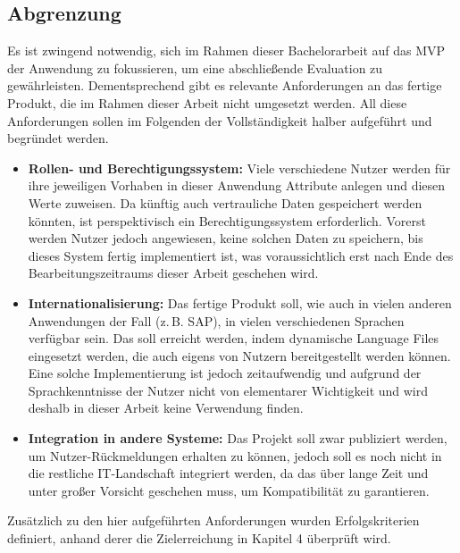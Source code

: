 \subsection{Abgrenzung}
Es ist zwingend notwendig, sich im Rahmen dieser Bachelorarbeit auf das MVP der Anwendung zu fokussieren, um eine abschließende
Evaluation zu gewährleisten. Dementsprechend gibt es relevante Anforderungen an das fertige Produkt, die im Rahmen dieser Arbeit 
nicht umgesetzt werden. All diese Anforderungen sollen im Folgenden der Vollständigkeit halber aufgeführt und begründet werden.

\begin{itemize}
  \item \textbf{Rollen- und Berechtigungssystem:} 
  Viele verschiedene Nutzer werden für ihre jeweiligen Vorhaben in dieser Anwendung Attribute anlegen und diesen Werte zuweisen. Da künftig auch vertrauliche Daten gespeichert 
  werden könnten, ist perspektivisch ein Berechtigungssystem erforderlich. Vorerst werden Nutzer jedoch angewiesen, keine solchen Daten zu speichern, bis dieses System fertig 
  implementiert ist, was voraussichtlich erst nach Ende des Bearbeitungszeitraums dieser Arbeit geschehen wird.
  
  \item \textbf{Internationalisierung:} 
  Das fertige Produkt soll, wie auch in vielen anderen Anwendungen der Fall (z.\,B. SAP), in vielen verschiedenen Sprachen verfügbar sein. 
  Das soll erreicht werden, indem dynamische Language Files eingesetzt werden, die auch eigens von Nutzern bereitgestellt werden können. Eine solche Implementierung 
  ist jedoch zeitaufwendig und aufgrund der Sprachkenntnisse der Nutzer nicht von elementarer Wichtigkeit und wird deshalb in dieser Arbeit keine Verwendung finden.
  
  \item \textbf{Integration in andere Systeme:} 
  Das Projekt soll zwar publiziert werden, um Nutzer-Rückmeldungen erhalten zu können, jedoch soll es noch nicht in die restliche IT-Landschaft integriert werden,
  da das über lange Zeit und unter großer Vorsicht geschehen muss, um Kompatibilität zu garantieren.
\end{itemize}

Zusätzlich zu den hier aufgeführten Anforderungen wurden Erfolgskriterien definiert, anhand derer die Zielerreichung in Kapitel 4 überprüft wird.
